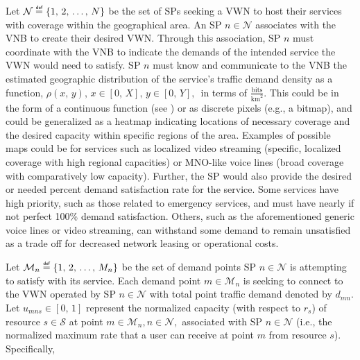 \documentclass[12pt,dvipsnames]{report}
\newcommand\defeq{\mathrel{\overset{\makebox[0pt]{\mbox{\normalfont\tiny\sffamily def}}}{=}}}
\begin{document}
Let $\mathcal{N} \defeq \left\{1,\, 2,\, \ldots,\, N\right\}$ be the set of SPs seeking a VWN to host their services with coverage within the geographical area.  An SP $n \in \mathcal{N}$ associates with the VNB to create their desired VWN.  Through this association, SP $n$ must coordinate with the VNB to indicate the demands of the intended service the VWN would need to satisfy.  SP $n$ must know and communicate to the VNB the estimated geographic distribution of the service's traffic demand density as a function, $\rho\left(x,\, y\right),\, x \in [0,\, X],\, y \in [0,\, Y],\,$ in terms of $\frac{\text{bits}}{\text{km}^2}$.  This could be in the form of a continuous function (see ) or as discrete pixels (e.g., a bitmap), and could be generalized as a heatmap indicating locations of necessary coverage and the desired capacity within specific regions of the area.  Examples of possible maps could be for services such as localized video streaming (specific, localized coverage with high regional capacities) or MNO-like voice lines (broad coverage with comparatively low capacity).  Further, the SP would also provide the desired or needed percent demand satisfaction rate for the service.  Some services have high priority, such as those related to emergency services, and must have nearly if not perfect 100\% demand satisfaction.  Others, such as the aforementioned generic voice lines or video streaming, can withstand some demand to remain unsatisfied as a trade off for decreased network leasing or operational costs.

Let $\mathcal{M}_n \defeq \left\{1,\, 2,\, \ldots,\, M_n\right\}$ be the set of demand points SP $n \in \mathcal{N}$ is attempting to satisfy with its service.  Each demand point $m \in \mathcal{M}_n$ is seeking to connect to the VWN operated by SP $n \in \mathcal{N}$ with total point traffic demand denoted by $d_{mn}$.  Let $u_{mns} \in [0,\, 1]$ represent the normalized capacity (with respect to $r_s$) of resource $s \in \mathcal{S}$ at point $m \in \mathcal{M}_n, n \in \mathcal{N},$ associated with SP $n \in \mathcal{N}$ (i.e., the normalized maximum rate that a user can receive at point $m$ from resource $s$).  Specifically,
\end{document}
